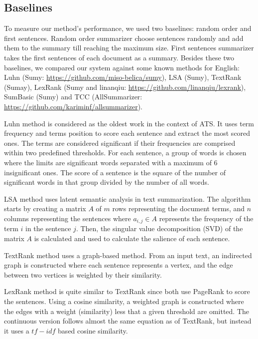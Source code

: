 \subsection{Baselines}

To measure our method's performance, we used two baselines: random order and first sentences. 
Random order summarizer choose sentences randomly and add them to the summary till reaching the maximum size. 
First sentences summarizer takes the first sentences of each document as a summary. 
Besides these two baselines, we compared our system against some known methods for English: Luhn (Sumy: \url{https://github.com/miso-belica/sumy}), LSA (Sumy), TextRank (Sumay), LexRank (Sumy and linanqiu: \url{https://github.com/linanqiu/lexrank}), SumBasic (Sumy) and TCC (AllSummarizer: \url{https://github.com/kariminf/allsummarizer}).

Luhn method \citep{58-luhn} is considered as the oldest work in the context of ATS. 
It uses term frequency and terms position to score each sentence and extract the most scored ones.
The terms are considered significant if their frequencies are comprised within two predefined thresholds. 
For each sentence, a group of words is chosen where the limits are significant words separated with a maximum of 6 insignificant ones.
The score of a sentence is the square of the number of significant words in that group divided by the number of all words.

LSA method \citep{04-steinberger-jezek} uses latent semantic analysis in text summarization. 
The algorithm starts by creating a matrix $ A $ of $ m $ rows representing the document terms, and 
$ n $ columns representing the sentences where $ a_{i, j} \in A $ represents the frequency of the term $ i $ in the sentence $ j $. 
Then, the singular value decomposition (SVD) of the matrix $ A $ is calculated and used to calculate the salience of each sentence.

TextRank method \citep{04-mihalcea-tarau} uses a graph-based method. 
From an input text, an indirected graph is constructed where each sentence represents a vertex, and the edge between two vertices is weighted by their similarity. 

LexRank method \citep{04-erkan-radev} is quite similar to TextRank since both use PageRank \citep{98-brin-page} to score the sentences. 
Using a cosine similarity, a weighted graph is constructed where the edges with a weight (similarity) less that a given threshold are omitted. 
The continuous version follows almost the same equation as of TextRank, but instead it uses a $ tf-idf $ based cosine similarity.

